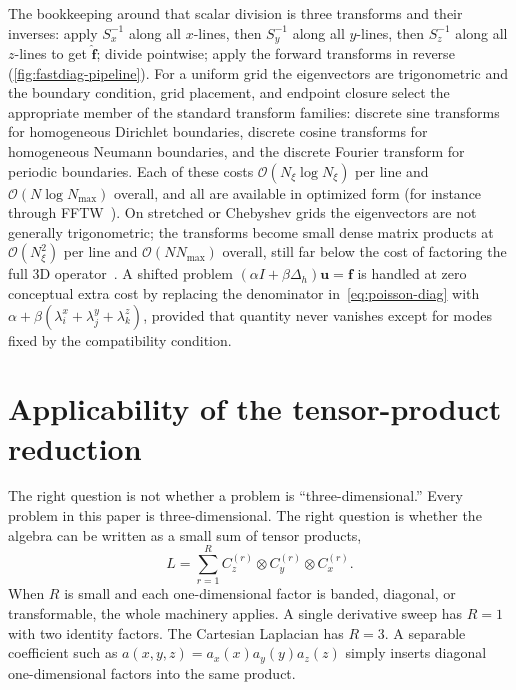 \documentclass[11pt]{article}
\newcommand{\kron}{\otimes}
\newcommand{\bigO}{\mathcal{O}}
\newcommand{\Lap}{\Delta_h}
\newcommand{\Nall}{N}
\begin{document}
The bookkeeping around that scalar division is three transforms and
their inverses: apply $S_x^{-1}$ along all $x$-lines, then $S_y^{-1}$
along all $y$-lines, then $S_z^{-1}$ along all $z$-lines to get
$\hat{\bm{f}}$; divide pointwise; apply the forward transforms in
reverse (\cref{fig:fastdiag-pipeline}).  For a uniform grid the
eigenvectors are trigonometric and the boundary condition, grid
placement, and endpoint closure select the appropriate member of the
standard transform families: discrete sine transforms for homogeneous
Dirichlet boundaries, discrete cosine transforms for homogeneous
Neumann boundaries, and the discrete Fourier transform for periodic
boundaries.  Each of these costs $\bigO(N_\xi \log N_\xi)$ per line
and $\bigO(\Nall \log N_{\max})$ overall, and all are available in
optimized form (for instance through FFTW~\citep{frigo2005design}).  On stretched or Chebyshev
grids the eigenvectors are not generally trigonometric; the transforms
become small dense matrix products at $\bigO(N_\xi^2)$ per line and
$\bigO(\Nall N_{\max})$ overall, still far below the cost of factoring
the full 3D operator~\citep{haidvogel1979accurate}.  A shifted problem
$(\alpha I+\beta\Lap)\bm{u}=\bm{f}$ is handled at zero conceptual
extra cost by replacing the denominator in~\cref{eq:poisson-diag} with
$\alpha+\beta(\lambda_i^x+\lambda_j^y+\lambda_k^z)$, provided that
quantity never vanishes except for modes fixed by the compatibility
condition.


\section{Applicability of the tensor-product reduction}
\label{sec:applicability}

The right question is not whether a problem is ``three-dimensional.''
Every problem in this paper is three-dimensional.  The right question is
whether the algebra can be written as a small sum of tensor products,
\begin{equation}
\label{eq:applicability-kron-sum}
  L = \sum_{r=1}^{R}
  C_z^{(r)} \kron C_y^{(r)} \kron C_x^{(r)}.
\end{equation}
When $R$ is small and each one-dimensional factor is banded, diagonal,
or transformable, the whole machinery applies.  A single derivative
sweep has $R=1$ with two identity factors.  The Cartesian Laplacian has
$R=3$.  A separable coefficient such as
$a(x,y,z)=a_x(x)a_y(y)a_z(z)$ simply inserts diagonal one-dimensional
factors into the same product.
\end{document}
